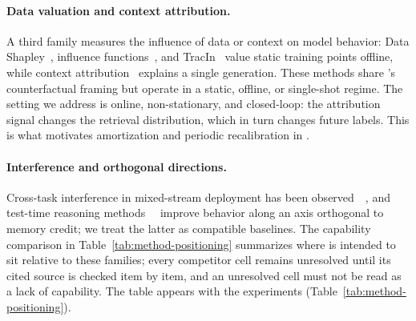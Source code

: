 \paragraph{Data valuation and context attribution.}
A third family measures the influence of data or context on model behavior: Data
Shapley~, influence
functions~, and TracIn~
value static training points offline, while
context attribution~ explains a single generation. These
methods share \method{}'s counterfactual framing but operate in a static,
offline, or single-shot regime. The setting we address is online, non-stationary,
and closed-loop: the attribution signal changes the retrieval distribution, which
in turn changes future labels. This is what motivates amortization and periodic
recalibration in \aca{}.

\paragraph{Interference and orthogonal directions.}
Cross-task interference in mixed-stream deployment has been
observed~~, and test-time reasoning
methods~~ improve behavior along an axis
orthogonal to memory credit; we treat the latter as compatible baselines. The
capability comparison in Table~\ref{tab:method-positioning} summarizes where
\method{} is intended to sit relative to these families; every competitor cell
remains unresolved until its cited source is checked item by item, and an
unresolved cell must not be read as a lack of capability. The table appears with
the experiments (Table~\ref{tab:method-positioning}).
